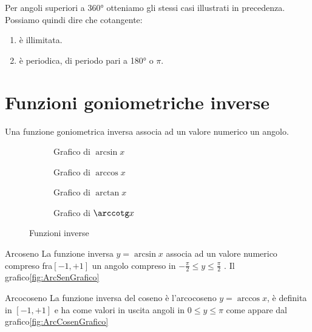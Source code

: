 Per angoli superiori a \ang{360} otteniamo gli stessi casi illustrati in precedenza. 
Possiamo quindi dire che cotangente:
\begin{enumerate}
	\item è illimitata.
	\item è periodica, di periodo pari a \ang{180} o $\pi$.
\end{enumerate} 
\begin{figure}
	\centering
	
	\label{fig:AndamentoCotangente2}
\end{figure}%
\section{Funzioni goniometriche inverse}
Una funzione goniometrica inversa associa ad un valore numerico un angolo.
\begin{figure}
	\begin{subfigure}[b]{.5\linewidth}
		\centering
	
		\caption{Grafico di $\arcsin x$}\label{fig:ArcSenGrafico}
	\end{subfigure}%
	\begin{subfigure}[b]{.5\linewidth}
		\centering
	
		\caption{Grafico di $\arccos x$}\label{fig:ArcCosenGrafico}
	\end{subfigure}
		\begin{subfigure}[b]{\linewidth}
			\centering
	
		\caption{Grafico di $\arctan x$}\label{fig:ArcTangenteGrafico}
		\end{subfigure}
		\begin{subfigure}[b]{\linewidth}
		\centering
		
		\caption{Grafico di $\arccotg x$}\label{fig:ArcCotangenteGrafico}
	\end{subfigure}
			\caption{Funzioni inverse}\label{tab:funzinverse_1}
\end{figure}
\begin{definizionet}{Arcoseno}{}
	La funzione inversa $y=\arcsin x$ associa ad un valore numerico compreso fra$[-1,+1]$ un angolo compreso in $-\frac{\pi}{2}\leq y\leq\frac{\pi}{2}$ . Il grafico\nobs\vref{fig:ArcSenGrafico} 
\end{definizionet}
\begin{definizionet}{Arcocoseno}{}
	La funzione inversa del coseno è l'arcocoseno $y=\arccos x$, è definita in $[-1,+1]$ e ha come valori in uscita angoli in $0\leq y\leq\pi$ come appare dal grafico\nobs\vref{fig:ArcCosenGrafico} 
\end{definizionet}
